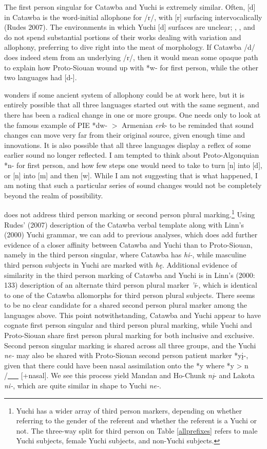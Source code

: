 \documentclass[output=paper]{LSP/langsci}
\begin{document}
The first person singular for Catawba and Yuchi is extremely similar. Often, [d] in Catawba is the word-initial allophone for /r/, with [r] surfacing intervocalically (Rudes 2007). The environments in which Yuchi [d] surfaces are unclear; \citet{Gatschet1885}, \citet{Wagner1934}, and \citet{Linn2000} do not spend substantial portions of their works dealing with variation and allophony, preferring to dive right into the meat of morphology. If Catawba /d/ does indeed stem from an underlying /r/, then it would mean some opaque path to explain how Proto-Siouan wound up with *w- for first person, while the other two languages had [d-]. 

\citet{Rankin1998} wonders if some ancient system of allophony could be at work here, but it is entirely possible that all three languages started out with the same segment, and there has been a radical change in one or more groups. One needs only to look at the famous example of PIE *dw- $>$ Armenian \emph{erk}- to be reminded that sound changes can move very far from their original source, given enough time and innovations. It is also possible that all three languages display a reflex of some earlier sound no longer reflected. I am tempted to think about Proto-Algonquian *n- for first person, and how few steps one would need to take to turn [n] into [d], or [n] into [m] and then [w]. While I am not suggesting that is what happened, I am noting that such a particular series of sound changes would not be completely beyond the realm of possibility.

\citet{Rankin1998} does not address third person marking or second person plural marking.\footnote{Yuchi has a wider array of third person markers, depending on whether referring to the gender of the referent and whether the referent is a Yuchi or not. The three-way split for third person on Table \ref{allprefixes} refers to male Yuchi subjects, female Yuchi subjects, and non-Yuchi subjects.} Using Rudes' (2007) description of the Catawba verbal template along with Linn's (2000) Yuchi grammar, we can add to previous analyses, which does add further evidence of a closer affinity between Catawba and Yuchi than to Proto-Siouan, namely in the third person singular, where Catawba has \emph{hi-}, while masculine third person subjects in Yuchi are marked with \emph{h\k{e}}. Additional evidence of similarity in the third person marking of Catawba and Yuchi is in Linn's (2000: 133) description of an alternate third person plural marker \emph{'i}-, which is identical to one of the Catawba allomorphs for third person plural subjects. There seems to be no clear candidate for a shared second person plural marker among the languages above. This point notwithstanding, Catawba and Yuchi appear to have cognate first person singular and third person plural marking, while Yuchi and Proto-Siouan share first person plural marking for both inclusive and exclusive. Second person singular marking is shared across all three groups, and the Yuchi \emph{ne-} may also be shared with Proto-Siouan second person patient marker *y\k{i}-, given that there could have been nasal assimilation onto the *y where *y > n /\underline{~~~} [+nasal]. We see this process yield Mandan and Ho-Chunk \emph{n\k{i}}- and Lakota \emph{ni-}, which are quite similar in shape to Yuchi \emph{ne-}.
\end{document}
